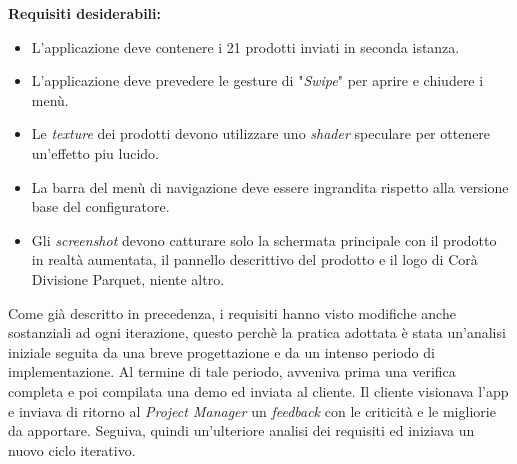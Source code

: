 \textbf{Requisiti desiderabili:}

\begin{itemize}
	\item L'applicazione deve contenere i 21 prodotti inviati in seconda istanza.
	
	\item L'applicazione deve prevedere le gesture di "\textit{Swipe}" per aprire e chiudere i men\`u.
	
	\item Le \textit{texture\gloss} dei prodotti devono utilizzare uno \textit{shader} speculare per ottenere un'effetto piu lucido.
	
	\item La barra del men\`u di navigazione deve essere ingrandita rispetto alla versione base del configuratore.
	
	\item Gli \textit{screenshot} devono catturare solo la schermata principale con il prodotto in realt\`a aumentata, il pannello descrittivo del prodotto e il logo di Cor\`a Divisione Parquet, niente altro.
\end{itemize}
\noindent
Come gi\`a descritto in precedenza, i requisiti hanno visto modifiche anche sostanziali ad ogni iterazione, questo perch\`e la pratica adottata \`e stata un'analisi iniziale seguita da una breve progettazione e da un intenso periodo di implementazione. Al termine di tale periodo, avveniva prima una verifica completa e poi compilata una demo ed inviata al cliente. Il cliente visionava l'app e inviava di ritorno al \textit{Project Manager} un \textit{feedback} con le criticit\`a e le migliorie da apportare. Seguiva, quindi un'ulteriore analisi dei requisiti ed iniziava un nuovo ciclo iterativo.\\\\


